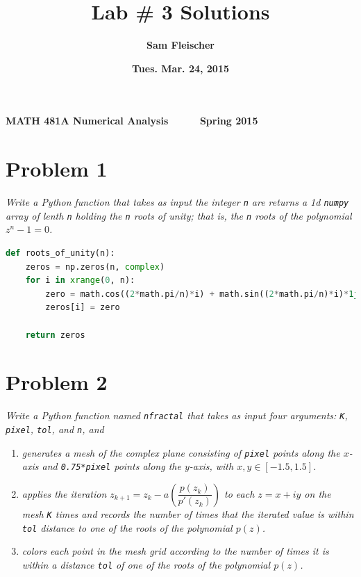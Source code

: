 \documentclass[12pt]{article}
\begin{document}
{\bf MATH 481A \hfill Numerical Analysis \ \ \ \ \ \hfill Spring 2015}

\title{\bf Lab \# 3 Solutions}
\author{\bf Sam Fleischer}
\date{\bf Tues. Mar. 24, 2015}

{\let\newpage\relax\maketitle}
\maketitle
\tableofcontents
\pagebreak

\section*{Problem 1}
{\it Write a Python function that takes as input the integer {\tt n} are returns a 1d {\tt numpy} array of lenth {\tt n} holding the {\tt n} roots of unity; that is, the {\tt n} roots of the polynomial $z^n - 1 = 0$.}

\begin{lstlisting}[language=Python, caption=Roots of Unity FUnction] 
def roots_of_unity(n):
    zeros = np.zeros(n, complex)
    for i in xrange(0, n):
        zero = math.cos((2*math.pi/n)*i) + math.sin((2*math.pi/n)*i)*1j
        zeros[i] = zero

    return zeros
\end{lstlisting}

\section*{Problem 2}
{\it Write a Python function named {\tt nfractal} that takes as input four arguments: {\tt K}, {\tt pixel}, {\tt tol}, and {\tt n}, and}
\begin{enumerate}[\it\ \ 1.\ \ ]
    \item {\it generates a mesh of the complex plane consisting of {\tt pixel} points along the $x$-axis and {\tt0.75*pixel} points along the $y$-axis, with $x,y\in [-1.5, 1.5]$.}
    \item {\it applies the iteration $z_{k+1} = z_k - a\left(\dfrac{p(z_k)}{p'(z_k)}\right)$ to each $z = x + iy$ on the mesh {\tt K} times and records the number of times that the iterated value is within {\tt tol} distance to one of the roots of the polynomial $p(z)$.}
    \item {\it colors each point in the mesh grid according to the number of times it is within a distance {\tt tol} of one of the roots of the polynomial $p(z)$.}
\end{enumerate}
\end{document}
